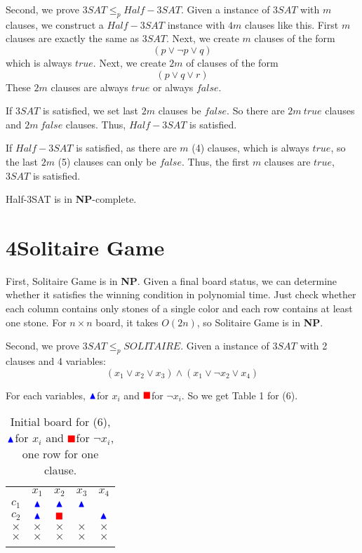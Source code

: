 \documentclass[a4paper,12pt]{article}
\begin{document}
Second, we prove $3SAT\leq_p Half-3SAT$. Given a instance of $3SAT$ with $m$ clauses, we construct a $Half-3SAT$ instance with $4m$ clauses like this. First $m$ clauses are exactly the same as $3SAT$. Next, we create $m$ clauses of the form
\[
(p\vee\lnot p\vee q)\tag{4}
\]
which is always $true$. Next, we create $2m$ of clauses of the form
\[
(p\vee q\vee r)\tag{5}
\]
These $2m$ clauses are always $true$ or always $false$.

If $3SAT$ is satisfied, we set last $2m$ clauses be $false$. So there are $2m~true$ clauses and $2m~false$ clauses. Thus, $Half-3SAT$ is satisfied.

If $Half-3SAT$ is satisfied, as there are $m$ (4) clauses, which is always $true$, so the last $2m$ (5) clauses can only be $false$. Thus, the first $m$ clauses are $true$, $3SAT$ is satisfied.

Half-3SAT is in \textbf{NP}-complete.

\section*{4\quad Solitaire Game}

First, Solitaire Game is in \textbf{NP}. Given a final board status, we can determine whether it satisfies the winning condition in polynomial time. Just check whether each column contains only stones of a single color and each row contains at least one stone. For $n\times n$ board, it takes $O(2n)$, so Solitaire Game is in \textbf{NP}.

Second, we prove $3SAT\leq_p SOLITAIRE$. Given a instance of $3SAT$ with
2 clauses and 4 variables:
\[
(x_1\vee x_2 \vee x_3)\land (x_1\vee \lnot x_2\vee x_4)\tag{6}
\]

\newcommand{\bstone}{$\begingroup\color{blue}{\blacktriangle}\endgroup$}
\newcommand{\rstone}{$\begingroup\color{red}{\blacksquare}\endgroup$}

For each variables, \bstone for $x_i$ and \rstone for $\lnot x_i$. So we get Table 1 for (6).

\begin{table}[!ht]
\centering
\begin{tabular}{c|c|c|c|c|}
\multicolumn{1}{c}{}& \multicolumn{1}{c}{$x_1$} & \multicolumn{1}{c}{$x_2$} & \multicolumn{1}{c}{$x_3$} & \multicolumn{1}{c}{$x_4$}\\
\hhline{~----}
$c_1$ & \bstone & \bstone & \bstone &   \\
\hhline{~----}
$c_2$ & \bstone & \rstone &  & \bstone  \\
\hhline{~----}
$\times$ & $\times$ & $\times$ & $\times$ & $\times$  \\
\hhline{~----}
$\times$ & $\times$ & $\times$ & $\times$ & $\times$  \\
\hhline{~----}
\end{tabular}
\caption{Initial board for (6), \bstone for $x_i$ and \rstone for $\lnot x_i$, one row for one clause.}
\end{table}
\end{document}
